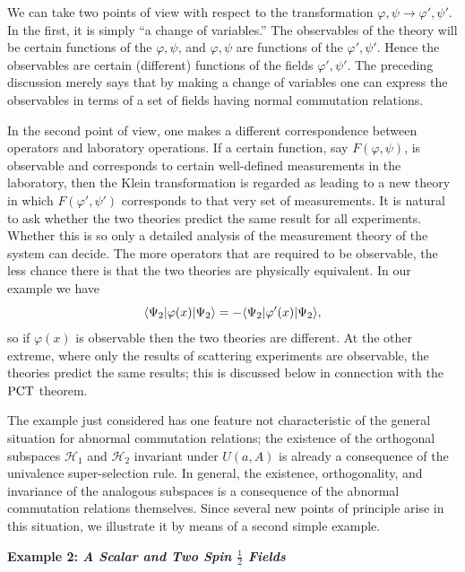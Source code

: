 We can take two points of view with respect to the transformation
$\varphi,\psi\to\varphi',\psi'$.  In the first, it is simply “a change of
variables.”  The observables of the theory will be certain functions of the
$\varphi,\psi$, and $\varphi,\psi$ are functions of the $\varphi',\psi'$.
Hence the observables are certain (different) functions of the fields
$\varphi',\psi'$.  The preceding discussion merely says that by making a
change of variables one can express the observables in terms of a set of
fields having normal commutation relations.

In the second point of view, one makes a different correspondence between
operators and laboratory operations.  If a certain function,
say $F(\varphi,\psi)$, is observable and corresponds to certain well-defined
measurements in the laboratory, then the Klein transformation is regarded as
leading to a new theory in which $F(\varphi',\psi')$ corresponds to that very
set of measurements.  It is natural to ask whether the two theories predict
the same result for all experiments.  Whether this is so only a detailed
analysis of the measurement theory of the system can decide.  The more
operators that are required to be observable, the less chance there is that the
two theories are physically equivalent.  In our example we have
\begin{equation*}
  \langle \Psi_2\rvert\varphi(x)\lvert \Psi_2\rangle
  =-\langle \Psi_2\rvert\varphi'(x)\lvert \Psi_2\rangle,
\end{equation*}
so if $\varphi(x)$ is observable then the two theories are different.  At the
other extreme, where only the results of scattering experiments are
observable, the theories predict the same results; this is discussed below in
connection with the $\mathrm{PCT}$ theorem.

The example just considered has one feature not characteristic of the general
situation for abnormal commutation relations; the existence of the orthogonal
subspaces $\mathcal H_1$ and $\mathcal H_2$ invariant under $U(a,A)$ is already
a consequence of the univalence super-selection rule.  In general, the
existence, orthogonality, and invariance of the analogous subspaces is a
consequence of the abnormal commutation relations themselves.  Since several
new points of principle arise in this situation, we illustrate it by means of
a second simple example.

\par\medskip\noindent\textbf{Example 2: \emph{A Scalar and Two Spin $\frac12$ Fields}}
\par\smallskip

